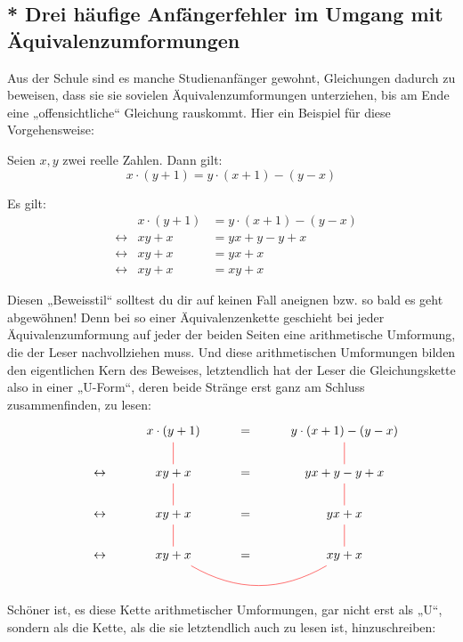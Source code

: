 \subsection{* Drei häufige Anfängerfehler im Umgang mit Äquivalenzumformungen}





\begin{bem}[„Gleichungs-U's“]
 Aus der Schule sind es manche Studienanfänger gewohnt, Gleichungen dadurch zu beweisen, dass sie sie sovielen Äquivalenzumformungen unterziehen, bis am Ende eine „offensichtliche“ Gleichung rauskommt. Hier ein Beispiel für diese Vorgehensweise:
 \begin{bsp}
  Seien $x,y$ zwei reelle Zahlen. Dann gilt:
  \[ x\cdot (y+1) = y\cdot (x+1)-(y-x) \]
 \end{bsp}
 \begin{bew} Es gilt:
  \begin{align*}
   && x\cdot (y+1)& = y\cdot (x+1)-(y-x) \\
   &\leftrightarrow& xy + x  & = yx + y - y+x \\
   &\leftrightarrow& xy + x  & = yx + x \\
      &\leftrightarrow& xy + x  & = xy + x
  \end{align*}
 \end{bew}
Diesen „Beweisstil“ solltest du dir auf keinen Fall aneignen bzw. so bald es geht abgewöhnen! Denn bei so einer Äquivalenzenkette geschieht bei jeder Äquivalenzumformung auf jeder der beiden Seiten eine arithmetische 
Umformung, die der Leser nachvollziehen muss. Und diese arithmetischen Umformungen bilden den eigentlichen Kern des Beweises, letztendlich hat der Leser die Gleichungskette also in einer „U-Form“, deren beide Stränge erst ganz am Schluss zusammenfinden, zu lesen:
\[ \begin{tikzcd}
     && x\cdot (y+1)\ar[red, d, dash] & =& y\cdot (x+1)-(y-x) \ar[red, d, dash] \\
   &\leftrightarrow& xy + x  \ar[red, d, dash] & =& yx + y - y+x \ar[red, d, dash] \\
   &\leftrightarrow& xy + x \ar[red, d, dash]  & =& yx + x \ar[red, d, dash] \\
      &\leftrightarrow& xy + x \ar[red, rr, dash, bend right] & =& xy + x  
   \end{tikzcd} \]
Schöner ist, es diese Kette arithmetischer Umformungen, gar nicht erst als „U“, sondern als die Kette, als die sie letztendlich auch zu lesen ist, hinzuschreiben:

\end{bem}
